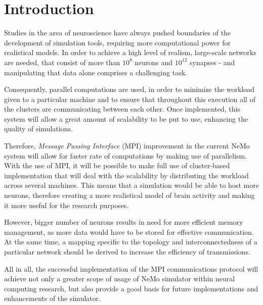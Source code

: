 \chapter{Introduction}

Studies in the area of neuroscience have always pushed boundaries of the development of simulation tools, requiring more computational power 
for realistical models. In order to achieve a high level of realism, large-scale networks are needed, that consist of more than \begin{math}10^8\end{math} neurons 
and \begin{math}10^{12}\end{math} synapses - and manipulating that data alone comprises a challenging task.

Consequently, parallel computations are used, in order to minimize the workload given to a particular machine and to ensure that throughout
this execution all of the clusters are communicating between each other. Once implemented, this system will allow a great amount of scalability
to be put to use, enhancing the quality of simulations.

Therefore, \emph{Message Passing Interface} (MPI) improvement in the current NeMo system will allow for faster rate of computations by making use 
of parallelism. With the use of MPI, it will be possible to make full use of cluster-based implementation that will deal with the scalability by 
distributing the workload across several machines. This means that a simulation would be able to host more neurons, therefore creating a more 
realistical model of brain activity and making it more useful for the research purposes.

However, bigger number of neurons results in need for more efficient memory management, as more data would have to be stored for effective 
communication. At the same time, a mapping specific to the topology and interconnectedness of a particular network should be derived to increase
the efficiency of transmissions.

All in all, the successful implementation of the MPI communications protocol will achieve not only a greater scope of usage of NeMo simulator within
neural computing research, but also provide a good basis for future implementations and enhancements of the simulator.
